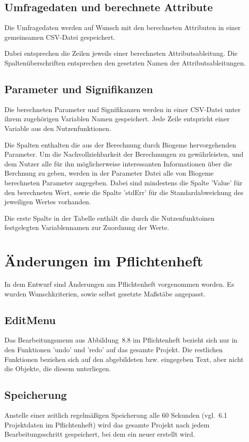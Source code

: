 \documentclass{article}
\newcommand{\classref}[1]{\texttt{\nameref{cls:#1}}}
\begin{document}
\subsection{Umfragedaten und berechnete Attribute}
Die Umfragedaten werden auf Wunsch mit den berechneten Attributen in einer gemeinsamen CSV-Datei gespeichert. 

Dabei entsprechen die Zeilen jeweils einer berechneten Attributsableitung. Die Spaltenüberschriften entsprechen den gesetzten Namen der Attributsableitungen. 

\subsection{Parameter und Signifikanzen}
Die berechneten Parameter und Signifikanzen werden in einer CSV-Datei unter ihrem zugehörigen Variablen Namen gespeichert. Jede Zeile entspricht einer Variable aus den Nutzenfunktionen.

Die Spalten enthalten die aus der Berechnung durch Biogeme hervorgehenden Parameter. Um die Nachvollziehbarkeit der Berechnungen zu gewährleisten, und dem Nutzer alle für ihn  möglicherweise interessanten Informationen über die Berchnung zu geben, werden in der Parameter Datei alle von Biogeme berechneten Parameter angegeben. Dabei sind mindestens die Spalte 'Value' für den berechneten Wert, sowie die Spalte 'stdErr' für die Standardabweichung des jeweiligen Wertes vorhanden.

Die erste Spalte in der Tabelle enthält die durch die Nutzenfunktoinen festgelegten Variablennamen zur Zuordnung der Werte.


\section{Änderungen im Pflichtenheft}
In dem Entwurf sind Änderungen am Pflichtenheft vorgenommen worden. Es wurden Wunschkriterien, sowie selbst gesetzte Maßstäbe angepasst.

\subsection{EditMenu}
Das Bearbeitungsmenu aus Abbildung~8.8 im Pflichtenheft bezieht sich nur in den Funktionen 'undo' und 'redo' auf das gesamte Projekt. Die restlichen Funktionen beziehen sich auf den abgebildeten bzw. eingegeben Text, aber nicht die Objekte, die diesem unterliegen.

\subsection{Speicherung}
Anstelle einer zeitlich regelmäßigen Speicherung alle 60 Sekunden (vgl.~6.1 Projektdaten im Pflichtenheft) wird das gesamte Projekt nach jedem Bearbeitungsschritt gespeichert, bei dem ein neuer \classref{ProjectSnapshot} erstellt wird.
\end{document}
